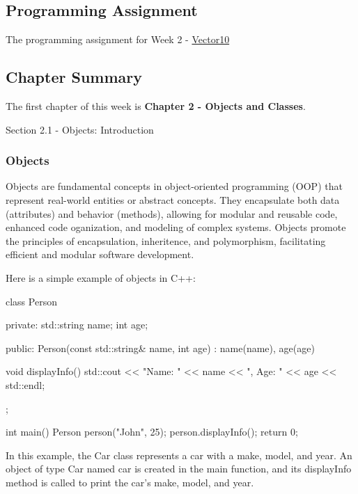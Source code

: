 \subsection{Programming Assignment}

The programming assignment for Week 2 - \href{https://github.com/QuantumCompiler/CU/tree/main/CSPB%202270%20-%20Data%20Structures/CSPB%202270%20-%20Programming%20Assignments/CSPB%202270%20-%20Assignment%201%20-%20Vector10}{Vector10}

\subsection{Chapter Summary}

The first chapter of this week is \textbf{Chapter 2 - Objects and Classes}.

\begin{notes}{Section 2.1 - Objects: Introduction}
    \subsubsection*{Objects}

    Objects are fundamental concepts in object-oriented programming (OOP) that represent real-world entities or abstract concepts. They encapsulate both data (attributes) and behavior (methods), allowing for modular and reusable
    code, enhanced code oganization, and modeling of complex systems. Objects promote the principles of encapsulation, inheritence, and polymorphism, facilitating efficient and modular software development.
    
    \begin{highlight}
        Here is a simple example of objects in C++:
    \begin{code}[C++]
    class Person {
    private:
        std::string name;
        int age;
    
    public:
        Person(const std::string& name, int age) : name(name), age(age) {}

        void displayInfo() {
            std::cout << "Name: " << name << ", Age: " << age << std::endl;
        }
    };

    int main() {
        Person person("John", 25);
        person.displayInfo();
        return 0;
    }
    \end{code}
        In this example, the Car class represents a car with a make, model, and year. An object of type Car named car is created in the main function, and its displayInfo method is called to print the car's make, model, and year.
    \end{highlight}
    

\end{notes}
